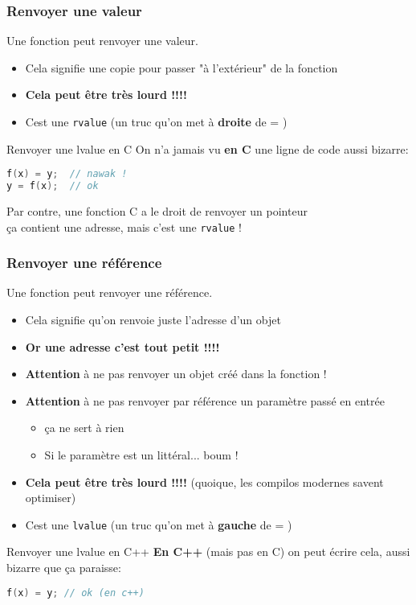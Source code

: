 \documentclass{beamer}
\begin{document}
\begin{frame}[fragile=singleslide,shrink=20]
\frametitle{Renvoyer une valeur}
Une fonction peut renvoyer une valeur.
\begin{itemize}
\item{Cela signifie une copie pour passer "à l'extérieur" de la fonction}
\item{\textbf{Cela peut être très lourd !!!!}}
\item{Cest une \texttt{rvalue} (un truc qu'on met à \textbf{droite} de = ) }
\end{itemize}

\begin{block}{Renvoyer une lvalue en C}
On n'a jamais vu \textbf{en C} une ligne de code aussi bizarre:
\begin{lstlisting}[language=c++]
f(x) = y;  // nawak !
y = f(x);  // ok
\end{lstlisting}
\end{block}
Par contre, une fonction C a le droit de renvoyer un pointeur \\
ça contient une adresse, mais c'est une \texttt{rvalue} !
\end{frame}

\begin{frame}[fragile=singleslide,shrink=20]
\frametitle{Renvoyer une référence}
Une fonction peut renvoyer une référence.
\begin{itemize}
\item{Cela signifie qu'on renvoie juste l'adresse d'un objet}
\item{\textbf{Or une adresse c'est tout petit !!!!}}
\item{\textbf{Attention} à ne pas renvoyer un objet créé dans la fonction !}
\item{\textbf{Attention} à ne pas renvoyer par référence un paramètre passé en entrée}
\begin{itemize}
\item{ça ne sert à rien}
\item{Si le paramètre est un littéral... boum !}
\end{itemize}
\item{\textbf{Cela peut être très lourd !!!!} (quoique, les compilos modernes savent optimiser) }
\item{Cest une \texttt{lvalue} (un truc qu'on met à \textbf{gauche} de = )}
\end{itemize}

\begin{block}{Renvoyer une lvalue en C++}
\textbf{En C++} (mais pas en C) on peut écrire cela, aussi bizarre que ça paraisse:
\begin{lstlisting}[language=c++]
f(x) = y; // ok (en c++)
\end{lstlisting}
\end{block}
\end{frame}
\end{document}

